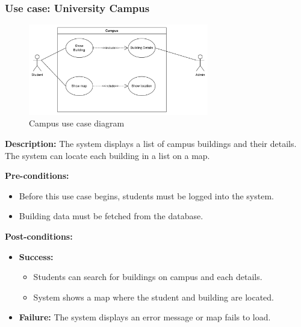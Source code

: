\documentclass{article}
\begin{document}
\subsubsection{Use case: University Campus}
    \begin{figure}[H]
        \centering
        \includegraphics[width=0.7\textwidth]{image/CampusUseCase.png} 
        \caption{Campus use case diagram}
        \label{fig:campus_use_case}
    \end{figure}
    \textbf{Description:} The system displays a list of campus buildings and their details. The system can locate each building in a list on a map.

    \noindent \textbf{Pre-conditions:} 
        \begin{itemize}
            \item Before this use case begins, students must be logged into the system.
            \item Building data must be fetched from the database.
        \end{itemize}
    \noindent \textbf{Post-conditions:}
    \begin{itemize}
        \item \textbf{Success:} 
        \begin{itemize}
            \item Students can search for buildings on campus and each details.
            \item System shows a map where the student and building are located.
        \end{itemize}
        \item \textbf{Failure:} The system displays an error message or map fails to load.
    \end{itemize}
\end{document}
